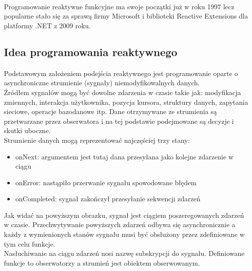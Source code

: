 \documentclass[11pt,twoside,a4paper]{report}
\begin{document}
\paragraph{}Programowanie reaktywne funkcyjne ma swoje początki już w roku 1997\cite{beginningOfRx} lecz popularne stało się za sprawą firmy Microsoft i biblioteki Reactive Extensions dla platformy .NET z 2009 roku\cite{rxMicrosoftYear}.
\subsection{Idea programowania reaktywnego}
\paragraph{}Podstawowym założeniem podejścia reaktywnego jest programowanie oparte o asynchroniczne strumienie (sygnały) niemodyfikowalnych danych.\\
Źródłem sygnałów mogą być dowolne zdarzenia w czasie takie jak: modyfikacja zmiennych, interakcja użytkownika, pozycja kursora, struktury danych, zapytania sieciowe, operacje bazodanowe itp. Dane otrzymywane ze strumienia są przetwarzane przez obserwatora i na tej podstawie podejmowane są decyzje i skutki uboczne.\\
Strumienie danych mogą reprezentować najczęściej trzy stany:
\begin{itemize}
	\item onNext: argumentem jest tutaj dana przesyłana jako kolejne zdarzenie w ciągu
	\item onError: nastąpiło przerwanie sygnału spowodowane błędem
	\item onCompleted: sygnał zakończył przesyłanie sekwencji zdarzeń
\end{itemize}
Jak widać na powyższym obrazku, sygnał jest ciągiem poszeregowanych zdarzeń w czasie. Przechwytywanie powyższych zdarzeń odbywa się asynchronicznie a każdy z wymienionych stanów sygnału musi być obsłużony przez zdefiniowane w tym celu funkcje. \\
Nasłuchiwanie na ciągu zdarzeń nosi nazwę subskrypcji do sygnału. Definiowane funkcje to obserwatorzy a strumień jest obiektem obserwowanym. 
\end{document}
